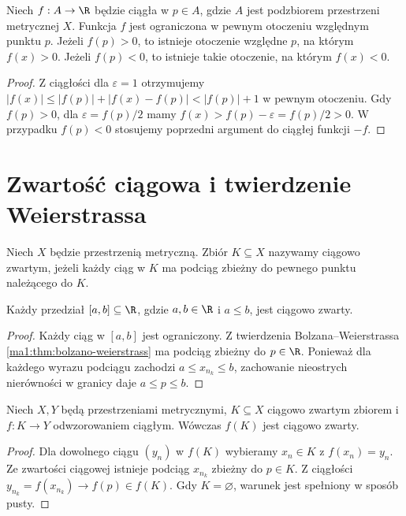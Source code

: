 \begin{wniosek}
\label{ma1:cor:continuous-local-bounds}
Niech $f:A\to\R$ będzie ciągła w $p\in A$, gdzie $A$ jest podzbiorem przestrzeni metrycznej $X$. Funkcja $f$ jest ograniczona w pewnym otoczeniu względnym punktu $p$. Jeżeli $f(p)>0$, to istnieje otoczenie względne $p$, na którym $f(x)>0$. Jeżeli $f(p)<0$, to istnieje takie otoczenie, na którym $f(x)<0$.
\end{wniosek}
\begin{proof}
Z ciągłości dla $\varepsilon=1$ otrzymujemy $|f(x)|\le |f(p)|+|f(x)-f(p)|<|f(p)|+1$ w pewnym otoczeniu. Gdy $f(p)>0$, dla $\varepsilon=f(p)/2$ mamy $f(x)>f(p)-\varepsilon=f(p)/2>0$. W przypadku $f(p)<0$ stosujemy poprzedni argument do ciągłej funkcji $-f$.
\end{proof}

\section{Zwartość ciągowa i twierdzenie Weierstrassa}
\begin{definicja}
\label{ma1:def:sequentially-compact}
Niech $X$ będzie przestrzenią metryczną. Zbiór $K\subseteq X$ nazywamy ciągowo zwartym, jeżeli każdy ciąg w $K$ ma podciąg zbieżny do pewnego punktu należącego do $K$.
\end{definicja}
\begin{lemat}
\label{ma1:lem:interval-seqcompact}
Każdy przedział $[a,b]\subseteq\R$, gdzie $a,b\in\R$ i $a\le b$, jest ciągowo zwarty.
\end{lemat}
\begin{proof}
Każdy ciąg w $[a,b]$ jest ograniczony. Z twierdzenia Bolzana--Weierstrassa \ref{ma1:thm:bolzano-weierstrass} ma podciąg zbieżny do $p\in\R$. Ponieważ dla każdego wyrazu podciągu zachodzi $a\le x_{n_k}\le b$, zachowanie nieostrych nierówności w granicy daje $a\le p\le b$.
\end{proof}
\begin{twierdzenie}
\label{ma1:thm:continuous-compact-image}
Niech $X,Y$ będą przestrzeniami metrycznymi, $K\subseteq X$ ciągowo zwartym zbiorem i $f:K\to Y$ odwzorowaniem ciągłym. Wówczas $f(K)$ jest ciągowo zwarty.
\end{twierdzenie}
\begin{proof}
Dla dowolnego ciągu $(y_n)$ w $f(K)$ wybieramy $x_n\in K$ z $f(x_n)=y_n$. Ze zwartości ciągowej istnieje podciąg $x_{n_k}$ zbieżny do $p\in K$. Z ciągłości $y_{n_k}=f(x_{n_k})\to f(p)\in f(K)$. Gdy $K=\varnothing$, warunek jest spełniony w sposób pusty.
\end{proof}


